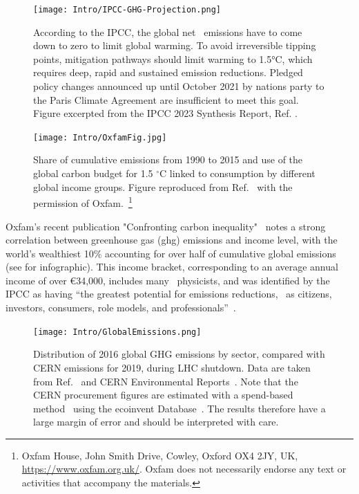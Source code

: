 \documentclass[../SustainableHEP.tex]{subfiles}
\begin{document}

\begin{figure}[!ht]
    \centering
    \texttt{[image: Intro/IPCC-GHG-Projection.png]}
    \caption[Necessary reduction in global emissions]%
        {According to the IPCC, the global net \CdO\ emissions have to come down to zero to limit global warming. To avoid irreversible tipping points, mitigation pathways should limit warming to 1.5°C, which requires deep, rapid and sustained emission reductions.  Pledged policy changes announced up until October 2021 by nations party to the Paris Climate Agreement are insufficient to meet this goal.  Figure excerpted from the IPCC 2023 Synthesis Report, Ref. \cite{IPCC2023SynthesisSPM}.
        \label{fig:ene-netco2}}
    \end{figure}


\begin{figure}
    \centering
    \texttt{[image: Intro/OxfamFig.jpg]}
    \caption[Global emissions (1990-2015) by income groups]{Share of cumulative emissions from 1990 to 2015 and use of the global carbon budget for 1.5 $^{\circ}$C linked to consumption by different global income groups. Figure reproduced from Ref.~\cite{Oxfam2020} with the permission of Oxfam.~\footnote{Oxfam House, John Smith Drive, Cowley, Oxford OX4 2JY, UK, \url{https://www.oxfam.org.uk/}.  Oxfam does not necessarily endorse any text or activities that accompany the materials.}}
    \label{fig:OxfamFig}
\end{figure}

Oxfam's recent publication "Confronting carbon inequality"~\cite{Oxfam2020} notes a strong correlation between greenhouse gas (\acrshort{ghg}) emissions and income level, with the world's wealthiest 10\% accounting for over half of cumulative global emissions (see  for infographic). This income bracket, corresponding to an average annual income of over \euro{34,000}, includes many \ACR\ physicists, and was identified by the IPCC as having ``the greatest potential for emissions reductions, \eg\ as citizens, investors, consumers, role models, and professionals''~\cite{IPCC2022reportSPM}.

\begin{figure}[!ht]
    \centering
    \texttt{[image: Intro/GlobalEmissions.png]}
    \caption[2016 global GHG emissions vs 2019 \acrshort{cern} emissions]%
        {Distribution of 2016 global GHG emissions by sector, compared with CERN emissions for 2019, during LHC shutdown. Data are taken from Ref.~\cite{OWIDGHGSector} and CERN Environmental Reports~\cite{Environment:2737239,CERN:2723123}. Note that the CERN procurement figures are estimated with a spend-based method~\cite{SpendBased} using the ecoinvent Database~\cite{ecoinvent}. The results therefore have a large margin of error and should be interpreted with care. \label{fig:intro-GlobalEmissions}}
    \end{figure}
\end{document}

